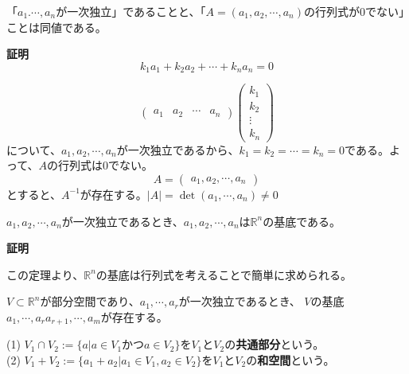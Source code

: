 \documentclass{jlreq}
\begin{document}
\begin{theorembox}[一次独立と行列式]
  「$a_1. \cdots, a_n$が一次独立」であることと、「$A = (a_1, a_2, \cdots, a_n)$の行列式が0でない」ことは同値である。

  \dotfill

  \textbf{証明} \\

  \begin{equation*}
    k_1 a_1 + k_2 a_2 + \cdots + k_n a_n = 0
  \end{equation*}

  \begin{equation*}
    \begin{pmatrix}
      a_1 & a_2 & \cdots & a_n
    \end{pmatrix}
    \begin{pmatrix}
      k_1 \\
      k_2 \\
      \vdots \\
      k_n
    \end{pmatrix}
  \end{equation*}
  について、$a_1, a_2, \cdots, a_n$が一次独立であるから、$k_1 = k_2 = \cdots = k_n = 0$である。よって、$A$の行列式は0でない。
  \begin{equation*}
    A = 
    \begin{pmatrix}
      a_1, a_2, \cdots, a_n
    \end{pmatrix}
  \end{equation*}
  とすると、$A^{-1}$が存在する。$|A| = \det (a_1, \cdots, a_n) \neq 0$
\end{theorembox}

\begin{theorembox}
  $a_1, a_2, \cdots, a_n$が一次独立であるとき、$a_1, a_2, \cdots, a_n$は$\mathbb{R}^n$の基底である。

  \dotfill

  \textbf{証明} \\
\end{theorembox}

この定理より、$\mathbb{R}^n$の基底は行列式を考えることで簡単に求められる。

\begin{theorembox}[部分空間の基底]
  $V \subset \mathbb{R}^n$が部分空間であり、$a_1, \cdots, a_r$が一次独立であるとき、
  $V$の基底$a_1, \cdots, a_r a_{r + 1}, \cdots, a_m$が存在する。
\end{theorembox}

\begin{definitionbox}[共通部分と和空間]
  (1) 
  $V_1 \cap V_2 := \{a | a \in V_1 \text{かつ} a \in V_2 \}$を$V_1$と$V_2$の\textbf{共通部分}という。 \\
  (2) 
  $V_1 + V_2 := \{a_1 + a_2 | a_1 \in V_1, a_2 \in V_2 \}$を$V_1$と$V_2$の\textbf{和空間}という。 
\end{definitionbox}
\end{document}
